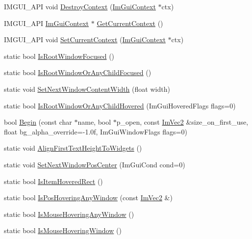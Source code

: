 \begin{DoxyCompactItemize}
\item 
I\+M\+G\+U\+I\+\_\+\+A\+PI void \hyperlink{namespace_im_gui_a344adba8bd84069dc7425b88306411c7}{Destroy\+Context} (\hyperlink{struct_im_gui_context}{Im\+Gui\+Context} $\ast$ctx)
\item 
I\+M\+G\+U\+I\+\_\+\+A\+PI \hyperlink{struct_im_gui_context}{Im\+Gui\+Context} $\ast$ \hyperlink{namespace_im_gui_af557a6de5538099a0f6047eb994bbf42}{Get\+Current\+Context} ()
\item 
I\+M\+G\+U\+I\+\_\+\+A\+PI void \hyperlink{namespace_im_gui_a289dbbbffdadcf1231821d97a7c4a9be}{Set\+Current\+Context} (\hyperlink{struct_im_gui_context}{Im\+Gui\+Context} $\ast$ctx)
\item 
static bool \hyperlink{namespace_im_gui_aa3fc41b9cef756f5bcdd837cc013c85c}{Is\+Root\+Window\+Focused} ()
\item 
static bool \hyperlink{namespace_im_gui_a1aafbea10ef614c5bf274b29c230f547}{Is\+Root\+Window\+Or\+Any\+Child\+Focused} ()
\item 
static void \hyperlink{namespace_im_gui_a5d492de86ca75e2b3b2eae112049e3ff}{Set\+Next\+Window\+Content\+Width} (float width)
\item 
static bool \hyperlink{namespace_im_gui_a048d3ecb7eb03f3416900dfbaac09d3f}{Is\+Root\+Window\+Or\+Any\+Child\+Hovered} (Im\+Gui\+Hovered\+Flags flags=0)
\item 
bool \hyperlink{namespace_im_gui_a288e01ff1c8102d6374a6b1e409b9878}{Begin} (const char $\ast$name, bool $\ast$p\+\_\+open, const \hyperlink{struct_im_vec2}{Im\+Vec2} \&size\+\_\+on\+\_\+first\+\_\+use, float bg\+\_\+alpha\+\_\+override=-\/1.\+0f, Im\+Gui\+Window\+Flags flags=0)
\item 
static void \hyperlink{namespace_im_gui_a0c1fd13ae89c240fb7547e244d672f9b}{Align\+First\+Text\+Height\+To\+Widgets} ()
\item 
static void \hyperlink{namespace_im_gui_a0d59dc9582f20c086d7882c86a41e8f2}{Set\+Next\+Window\+Pos\+Center} (Im\+Gui\+Cond cond=0)
\item 
static bool \hyperlink{namespace_im_gui_a3be4bc9167af21ffe603bce68c94b947}{Is\+Item\+Hovered\+Rect} ()
\item 
static bool \hyperlink{namespace_im_gui_a5d6182f4b163a2de64bc2a27d594c201}{Is\+Pos\+Hovering\+Any\+Window} (const \hyperlink{struct_im_vec2}{Im\+Vec2} \&)
\item 
static bool \hyperlink{namespace_im_gui_a183b8ebc12d5d90dacde5498043ccab9}{Is\+Mouse\+Hovering\+Any\+Window} ()
\item 
static bool \hyperlink{namespace_im_gui_a4ecd1146fdb6a12794bf742cb5c7c3fd}{Is\+Mouse\+Hovering\+Window} ()

\end{DoxyCompactItemize}
